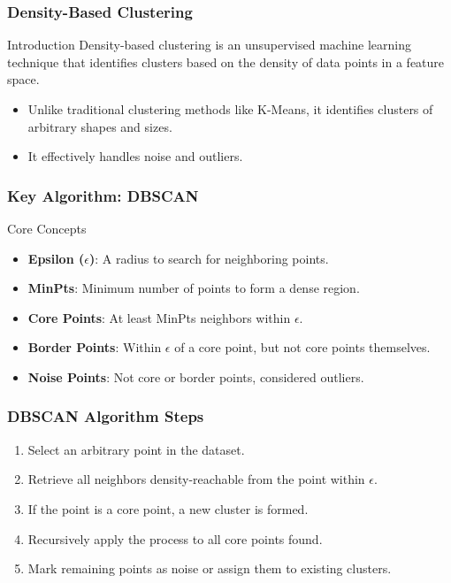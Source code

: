 \documentclass[aspectratio=169]{beamer}
\begin{document}
\begin{frame}[fragile]
    \frametitle{Density-Based Clustering}
    \begin{block}{Introduction}
        Density-based clustering is an unsupervised machine learning technique that identifies clusters based on the density of data points in a feature space. 
        \begin{itemize}
            \item Unlike traditional clustering methods like K-Means, it identifies clusters of arbitrary shapes and sizes.
            \item It effectively handles noise and outliers.
        \end{itemize}
    \end{block}
\end{frame}

\begin{frame}[fragile]
    \frametitle{Key Algorithm: DBSCAN}
    \begin{block}{Core Concepts}
        \begin{itemize}
            \item \textbf{Epsilon ($\epsilon$)}: A radius to search for neighboring points.
            \item \textbf{MinPts}: Minimum number of points to form a dense region.
        \end{itemize}
    \end{block}
    \begin{itemize}
        \item \textbf{Core Points}: At least MinPts neighbors within $\epsilon$.
        \item \textbf{Border Points}: Within $\epsilon$ of a core point, but not core points themselves.
        \item \textbf{Noise Points}: Not core or border points, considered outliers.
    \end{itemize}
\end{frame}

\begin{frame}[fragile]
    \frametitle{DBSCAN Algorithm Steps}
    \begin{enumerate}
        \item Select an arbitrary point in the dataset.
        \item Retrieve all neighbors density-reachable from the point within $\epsilon$.
        \item If the point is a core point, a new cluster is formed.
        \item Recursively apply the process to all core points found.
        \item Mark remaining points as noise or assign them to existing clusters.
    \end{enumerate}
\end{frame}
\end{document}
